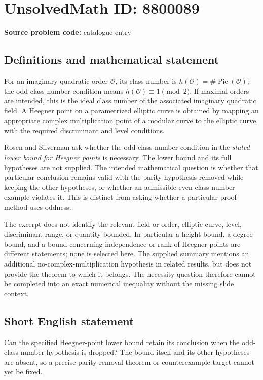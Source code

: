 \documentclass[11pt]{article}
\begin{document}
\section*{UnsolvedMath ID: 8800089}
\textbf{Source problem code:} catalogue entry
\subsection{Definitions and mathematical statement}
For an imaginary quadratic order \(\mathcal O\), its class number is \(h(\mathcal O)=\#\operatorname{Pic}(\mathcal O)\); the odd-class-number condition means \(h(\mathcal O)\equiv1\pmod2\). If maximal orders are intended, this is the ideal class number of the associated imaginary quadratic field. A Heegner point on a parametrized elliptic curve is obtained by mapping an appropriate complex multiplication point of a modular curve to the elliptic curve, with the required discriminant and level conditions.

Rosen and Silverman ask whether the odd-class-number condition in the \emph{stated lower bound for Heegner points} is necessary. The lower bound and its full hypotheses are not supplied. The intended mathematical question is whether that particular conclusion remains valid with the parity hypothesis removed while keeping the other hypotheses, or whether an admissible even-class-number example violates it. This is distinct from asking whether a particular proof method uses oddness.

The excerpt does not identify the relevant field or order, elliptic curve, level, discriminant range, or quantity bounded. In particular a height bound, a degree bound, and a bound concerning independence or rank of Heegner points are different statements; none is selected here. The supplied summary mentions an additional no-complex-multiplication hypothesis in related results, but does not provide the theorem to which it belongs. The necessity question therefore cannot be completed into an exact numerical inequality without the missing slide context.
\subsection{Short English statement}
Can the specified Heegner-point lower bound retain its conclusion when the odd-class-number hypothesis is dropped? The bound itself and its other hypotheses are absent, so a precise parity-removal theorem or counterexample target cannot yet be fixed.
\end{document}
